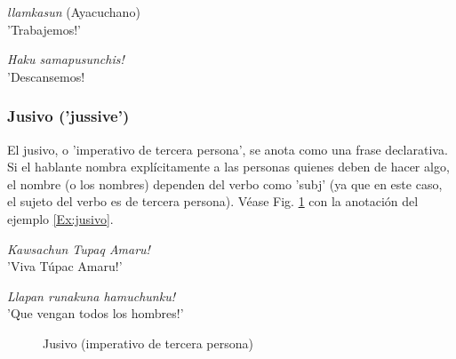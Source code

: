 \documentclass[a4paper,11pt,DIV12]{scrartcl}
\begin{document}
\begin{examples}
 \item {\em llamkasun} (Ayacuchano)\\
	'{\textexclamdown}Trabajemos!'\\
 	\hfill{\small \citep[50]{Dedenbach02}}
 \item {\em Haku samapusunchis!}\\
	'{\textexclamdown}Descansemos!\\
 	\hfill{\small \citep[255]{Cusi2}}
\end{examples}

\subsubsection{Jusivo ('jussive')}
El jusivo, o 'imperativo de tercera persona', se anota como una frase declarativa. Si el hablante nombra expl\'icitamente  a las personas quienes deben de hacer algo, el nombre (o los nombres) dependen del verbo como 'subj' (ya que en este caso, el sujeto del verbo es de tercera persona). V\'ease Fig. \ref{Fig:jusivo} con la anotaci\'on del ejemplo \ref{Ex:jusivo}.

\begin{examples}
 \item\label{Ex:jusivo} {\em Kawsachun Tupaq Amaru!}\\
      '{\textexclamdown}Viva T\'upac Amaru!'
 \item {\em Llapan runakuna hamuchunku!}\\
      '{\textexclamdown}Que vengan todos los hombres!'
 	\hfill{\small \citep[255]{Cusi2}}
\end{examples}

\begin{figure}
\begin{center}
\caption{Jusivo (imperativo de tercera persona)}\label{Fig:jusivo}
\end{center}
\end{figure}
\end{document}
